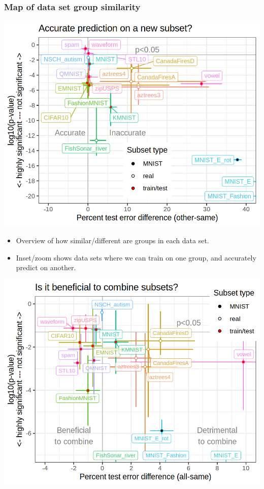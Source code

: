 \documentclass{beamer}
\begin{document}
\begin{frame}
  \frametitle{Map of data set group similarity}
  \includegraphics[width=\textwidth]{data_Classif_batchmark_registry_scatter_other_segments.png}
  \begin{itemize}
  \item Overview of how similar/different are groups in each data set. 
  \item Inset/zoom shows data sets where we can train on one group,
    and accurately predict on another.
  \end{itemize}
\end{frame}

\begin{frame}
  \includegraphics[height=\textheight]{data_Classif_batchmark_registry_scatter_all_segments.png}
\end{frame}
 
\end{document}
